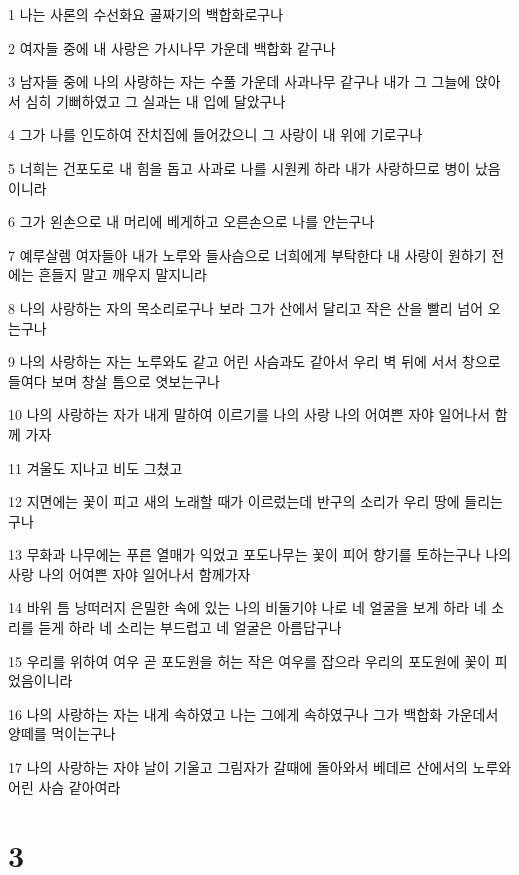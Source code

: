 \par 1 나는 사론의 수선화요 골짜기의 백합화로구나
\par 2 여자들 중에 내 사랑은 가시나무 가운데 백합화 같구나
\par 3 남자들 중에 나의 사랑하는 자는 수풀 가운데 사과나무 같구나 내가 그 그늘에 앉아서 심히 기뻐하였고 그 실과는 내 입에 달았구나
\par 4 그가 나를 인도하여 잔치집에 들어갔으니 그 사랑이 내 위에 기로구나
\par 5 너희는 건포도로 내 힘을 돕고 사과로 나를 시원케 하라 내가 사랑하므로 병이 났음이니라
\par 6 그가 왼손으로 내 머리에 베게하고 오른손으로 나를 안는구나
\par 7 예루살렘 여자들아 내가 노루와 들사슴으로 너희에게 부탁한다 내 사랑이 원하기 전에는 흔들지 말고 깨우지 말지니라
\par 8 나의 사랑하는 자의 목소리로구나 보라 그가 산에서 달리고 작은 산을 빨리 넘어 오는구나
\par 9 나의 사랑하는 자는 노루와도 같고 어린 사슴과도 같아서 우리 벽 뒤에 서서 창으로 들여다 보며 창살 틈으로 엿보는구나
\par 10 나의 사랑하는 자가 내게 말하여 이르기를 나의 사랑 나의 어여쁜 자야 일어나서 함께 가자
\par 11 겨울도 지나고 비도 그쳤고
\par 12 지면에는 꽃이 피고 새의 노래할 때가 이르렀는데 반구의 소리가 우리 땅에 들리는구나
\par 13 무화과 나무에는 푸른 열매가 익었고 포도나무는 꽃이 피어 향기를 토하는구나 나의 사랑 나의 어여쁜 자야 일어나서 함께가자
\par 14 바위 틈 낭떠러지 은밀한 속에 있는 나의 비둘기야 나로 네 얼굴을 보게 하라 네 소리를 듣게 하라 네 소리는 부드럽고 네 얼굴은 아름답구나
\par 15 우리를 위하여 여우 곧 포도원을 허는 작은 여우를 잡으라 우리의 포도원에 꽃이 피었음이니라
\par 16 나의 사랑하는 자는 내게 속하였고 나는 그에게 속하였구나 그가 백합화 가운데서 양떼를 먹이는구나
\par 17 나의 사랑하는 자야 날이 기울고 그림자가 갈때에 돌아와서 베데르 산에서의 노루와 어린 사슴 같아여라

\chapter{3}

